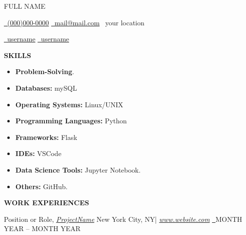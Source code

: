 \documentclass[a4paper,10pt]{article}
\makeatletter
\newcommand{\Name}{\begin{Huge}FULL NAME\end{Huge}}
\newcommand{\Phone}{\href{tel:(000)000-000}{\faPhone\ (000)000-0000}}
\newcommand{\Email}{\href{mailto:mail@mail.com}{\faEnvelope\ mail@mail.com}}
\newcommand{\GitHubURL}{\href{https://github.com/username/}{\faGithub \ username}}
\newcommand{\LinkedInURL}{\href{https://www.linkedin.com/in/username/}{\faLinkedin\ username}}
\newcommand{\Address}{\faMapPin\ your location}
\newcommand{\Skills}
{\begin{flushleft}\begin{large}\textbf{SKILLS \hrulefill}\end{large}\end{flushleft}}
\newcommand{\Work}
{\begin{flushleft}\begin{large}\textbf{WORK EXPERIENCES \hrulefill}\end{large}\end{flushleft}}
\newcommand{\SoftSkills}
{Problem-Solving}
\newcommand{\Databases}
{mySQL}
\newcommand{\OS}
{Linux/UNIX}
\newcommand{\Languages}
{Python}
\newcommand{\Framework}
{Flask}
\newcommand{\IDE}
{VSCode}
\newcommand{\DataTool}
{Jupyter Notebook.}
\newcommand{\Other}
{GitHub.}
\makeatother
\begin{document}
\Name \hspace*{0.25 in} \Phone \hspace*{0.25 in} \Email \hspace*{0.25 in} \Address\

\vspace*{5pt}
\GitHubURL \hspace{0.25 in} \LinkedInURL\

\Skills
\begin{itemize}
\item \textbf{\SoftSkills}.

\item \textbf{Databases: }\Databases

\item \textbf{Operating Systems: }\OS

\item \textbf{Programming Languages: }\Languages

\item \textbf{Frameworks: }\Framework

\item \textbf{IDEs: }\IDE

\item \textbf{Data Science Tools: }\DataTool

\item \textbf{Others: }\Other

\end{itemize}\vspace*{5pt}
\Work
Position or Role,
\textit{\href{https://www.google.com}{ProjectName}}{\hspace{0.15 in} New York City, NY| \textit{\href{www.google.com}{www.website.com}} \textit{\href{https://website.com}{ \faInfoCircle
\ }}}{\hspace{0.05 in}MONTH YEAR – MONTH YEAR}\vspace*{5pt}
\end{document}
